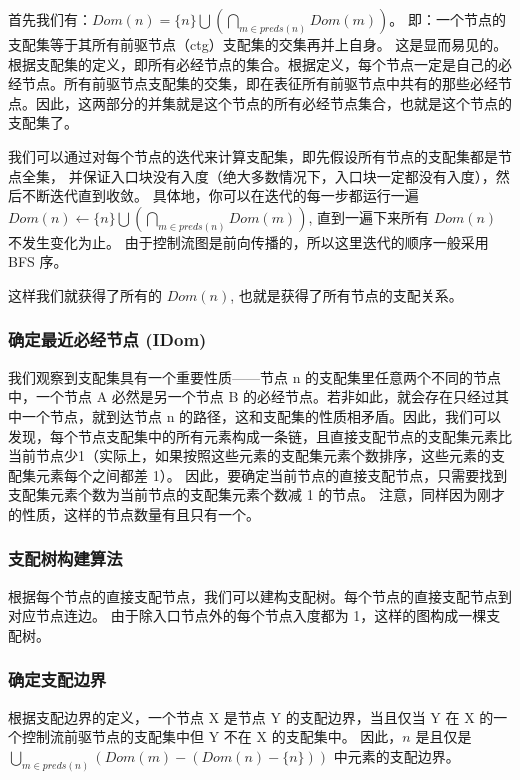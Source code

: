 首先我们有：$\mathit{Dom}(n) = \{n\} \bigcup \left(\bigcap_{m\in \mathit{preds}(n)} \mathit{Dom}(m)\right)$。
即：一个节点的支配集等于其所有前驱节点（ctg）支配集的交集再并上自身。
这是显而易见的。根据支配集的定义，即所有必经节点的集合。根据定义，每个节点一定是自己的必经节点。所有前驱节点支配集的交集，即在表征所有前驱节点中共有的那些必经节点。因此，这两部分的并集就是这个节点的所有必经节点集合，也就是这个节点的支配集了。

我们可以通过对每个节点的迭代来计算支配集，即先假设所有节点的支配集都是节点全集，
并保证入口块没有入度（绝大多数情况下，入口块一定都没有入度），然后不断迭代直到收敛。
具体地，你可以在迭代的每一步都运行一遍 $\mathit{Dom}(n) \leftarrow \{n\} \bigcup
\left(\bigcap_{m\in \mathit{preds}(n)} \mathit{Dom}(m)\right)$,
直到一遍下来所有 $\mathit{Dom}(n)$ 不发生变化为止。
由于控制流图是前向传播的，所以这里迭代的顺序一般采用 BFS 序。

这样我们就获得了所有的 $\mathit{Dom}(n)$, 也就是获得了所有节点的支配关系。

\subsubsection{确定最近必经节点 (IDom)}

我们观察到支配集具有一个重要性质——节点 n 的支配集里任意两个不同的节点中，一个节点 A 必然是另一个节点 B 的必经节点。若非如此，就会存在只经过其中一个节点，就到达节点 n 的路径，这和支配集的性质相矛盾。因此，我们可以发现，每个节点支配集中的所有元素构成一条链，且直接支配节点的支配集元素比当前节点少1（实际上，如果按照这些元素的支配集元素个数排序，这些元素的支配集元素每个之间都差 1）。
因此，要确定当前节点的直接支配节点，只需要找到支配集元素个数为当前节点的支配集元素个数减 1 的节点。
注意，同样因为刚才的性质，这样的节点数量有且只有一个。

\subsubsection{支配树构建算法}

根据每个节点的直接支配节点，我们可以建构支配树。每个节点的直接支配节点到对应节点连边。
由于除入口节点外的每个节点入度都为 1，这样的图构成一棵支配树。


\subsubsection{确定支配边界}

根据支配边界的定义，一个节点 X 是节点 Y 的支配边界，当且仅当 Y 在 X 的一个控制流前驱节点的支配集中但 Y 不在 X 的支配集中。
因此，$n$ 是且仅是 $\bigcup_{m\in\mathit{preds}(n)}\left(\mathit{Dom}(m)-(\mathit{Dom}(n)-\{n\})\right)$
中元素的支配边界。

